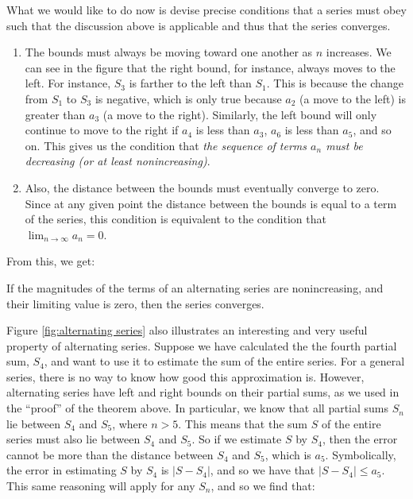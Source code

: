 \documentclass{myarticle}
\theoremstyle{nospace}
\newtheorem{old series theorem}{Theorem}
\newenvironment{series theorem}{\begin{mdframed}\begin{old series theorem}}{\end{old series theorem}\end{mdframed}}
\begin{document}
What we would like to do now is devise precise conditions that a series must obey such that the discussion above is applicable and thus that the series converges.

\begin{enumerate}
\item The bounds must always be moving toward one another as $n$ increases. We can see in the figure that the right bound, for instance, always moves to the left. For instance, $S_3$ is farther to the left than $S_1$. This is because the change from $S_1$ to $S_3$ is negative, which is only true because $a_2$ (a move to the left) is greater than $a_3$ (a move to the right). Similarly, the left bound will only continue to move to the right if $a_4$ is less than $a_3$, $a_6$ is less than $a_5$, and so on. This gives us the condition that \emph{the sequence of terms $a_n$ must be decreasing (or at least nonincreasing)}.
\item Also, the distance between the bounds must eventually converge to zero. Since at any given point the distance between the bounds is equal to a term of the series, this condition is equivalent to the condition that \emph{$\lim_{n \to \infty} a_n = 0$}.
\end{enumerate}

From this, we get:

\begin{series theorem} If the magnitudes of the terms of an alternating series are nonincreasing, and their limiting value is zero, then the series converges. \end{series theorem}

Figure \ref{fig:alternating series} also illustrates an interesting and very useful property of alternating series. Suppose we have calculated the the fourth partial sum, $S_4$, and want to use it to estimate the sum of the entire series. For a general series, there is no way to know how good this approximation is. However, alternating series have left and right bounds on their partial sums, as we used in the ``proof'' of the theorem above. In particular, we know that all partial sums $S_n$ lie between $S_4$ and $S_5$, where $n > 5$. This means that the sum $S$ of the entire series must also lie between $S_4$ and $S_5$. So if we estimate $S$ by $S_4$, then the error cannot be more than the distance between $S_4$ and $S_5$, which is $a_5$. Symbolically, the error in estimating $S$ by $S_4$ is $|S - S_4|$, and so we have that $|S - S_4| \leq a_5$.  This same reasoning will apply for any $S_n$, and so we find that:
\end{document}
